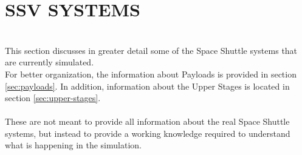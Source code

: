 \documentclass[Space_Shuttle_Vessel_Manual.tex]{subfiles}
\begin{document}
\section{SSV SYSTEMS}
\begin{multicols*}{2}
\renewcommand{\cfttoctitlefont}{\bf}
\localtableofcontents
\noindent
\\
This section discusses in greater detail some of the Space Shuttle systems that are currently simulated.\\
For better organization, the information about Payloads is provided in section \ref{sec:payloads}. In addition, information about the Upper Stages is located in section \ref{sec:upper-stages}.
\\
\\
These are not meant to provide all information about the real Space Shuttle systems, but instead to provide a working knowledge required to understand what is happening in the simulation.
\end{multicols*}
\end{document}
